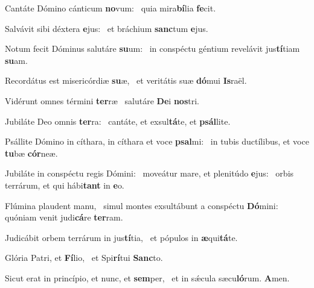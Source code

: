 \item Cantáte Dómino cánticum \textbf{no}vum:~\psstar{} quia mira\textbf{bí}lia \textbf{fe}cit.
\item Salvávit sibi déxtera \textbf{e}jus:~\psstar{} et bráchium \textbf{sanc}tum \textbf{e}jus.
\item Notum fecit Dóminus salutáre \textbf{su}um:~\psstar{} in conspéctu géntium revelávit jus\textbf{tí}tiam \textbf{su}am.
\item Recordátus est misericórdiæ \textbf{su}æ,~\psstar{} et veritátis suæ \textbf{dó}mui \textbf{Is}raël.
\item Vidérunt omnes términi \textbf{ter}ræ~\psstar{} salutáre \textbf{De}i \textbf{nos}tri.
\item Jubiláte Deo omnis \textbf{ter}ra:~\psstar{} cantáte, et exsul\textbf{tá}te, et \textbf{psál}lite.
\item Psállite Dómino in cíthara, in cíthara et voce \textbf{psal}mi:~\psstar{} in tubis ductílibus, et voce \textbf{tu}bæ \textbf{cór}neæ.
\item Jubiláte in conspéctu regis Dómini:~\pscross{} moveátur mare, et plenitúdo \textbf{e}jus:~\psstar{} orbis terrárum, et qui hábi\textbf{tant} in \textbf{e}o.
\item Flúmina plaudent manu,~\pscross{} simul montes exsultábunt a conspéctu \textbf{Dó}mini:~\psstar{} quóniam venit judi\textbf{cá}re \textbf{ter}ram.
\item Judicábit orbem terrárum in jus\textbf{tí}tia,~\psstar{} et pópulos in \textbf{æ}qui\textbf{tá}te.
\item Glória Patri, et \textbf{Fí}lio,~\psstar{} et Spi\textbf{rí}tui \textbf{Sanc}to.
\item Sicut erat in princípio, et nunc, et \textbf{sem}per,~\psstar{} et in sǽcula sæcu\textbf{ló}rum. \textbf{A}men.
